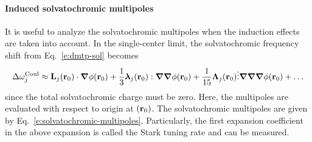 \documentclass[a4paper,titlepage,twoside,fleqn,12pt]{book}
\newcommand{\BM}[1]{\bm{#1}}
\begin{document}
\begin{refsection}
\paragraph{Induced solvatochromic multipoles}
It is useful to analyze the solvatochromic multipoles 
when the induction effects are taken into account.
In the single\hyp{}center limit, the solvatochromic
frequency shift from Eq.~\eqref{e:dmtp-sol}
becomes
%
\begin{equation} \label{e:dmtp-solmmm}
 \Delta\omega_j^{\rm Coul} \approx  
                        {\bf L}_j({\bf r}_0) \cdot {\BM \nabla} \phi({\bf r}_0)   + 
      \frac{1}{3} {\BM \lambda}_j({\bf r}_0) : {\BM \nabla}  {\BM \nabla} \phi({\bf r}_0)   + 
     \frac{1}{15} {\BM \Lambda}_j({\bf r}_0) \vdots {\BM \nabla}  {\BM \nabla}  {\BM \nabla} \phi({\bf r}_0) + \ldots
\end{equation}
%
since the total solvatochromic charge must be zero. Here, the multipoles
are evaluated with respect to origin at $({\bf r}_0)$.
The solvatochromic multipoles are given by Eq.~\eqref{e:solvatochromic-multipoles}.
Particularly, the first expansion coefficient in the above expansion
is called the Stark tuning rate and can be measured.


\end{refsection}
\end{document}
